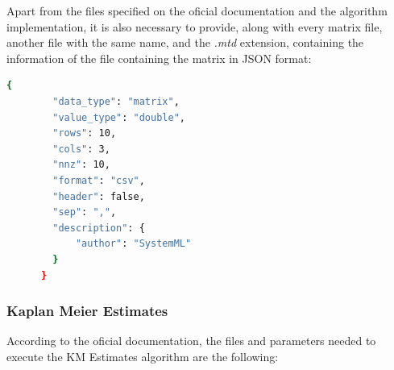 \documentclass[11pt]{book} %
\begin{document}
    Apart from the files specified on the oficial documentation and the algorithm implementation, it is also necessary to provide, along with every matrix file, another file with the same name, and the \emph{.mtd} extension, containing the information of the file containing the matrix in JSON format:

    \begin{lstlisting}[label=matrix_metadata_file, language=sh, caption=Example of matrix metadata file in JSON format]
      {
        "data_type": "matrix",
        "value_type": "double",
        "rows": 10,
        "cols": 3,
        "nnz": 10,
        "format": "csv",
        "header": false,
        "sep": ",",
        "description": {
            "author": "SystemML"
        }
      }
    \end{lstlisting}

\newpage

    \subsubsection{Kaplan Meier Estimates}

      According to the oficial documentation, the files and parameters needed to execute the KM Estimates algorithm are the following:
\end{document}
